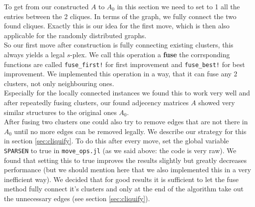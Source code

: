 To get from our constructed $A$ to $A_0$ in this section we need to set to 1 all the entries between the 2 cliques. 
In terms of the graph, we fully connect the two found cliques. Exactly this is our idea for the first move, which is 
then also applicable for the randomly distributed graphs.\\
So our first move after construction is fully connecting existing clusters, this always yields a legal $s$-plex. We 
call this operation a \textbf{fuse} the corrsponding functions are called \texttt{fuse\_first!} for first improvement 
and \texttt{fuse\_best!} for best improvement. We implemented this operation in a way, that it can fuse any 2 clusters, 
not only neighbouring ones.\\
Especially for the locally connected instances we found this to work very well and after repeatedly fusing clusters, 
our found adjecency matrices $A$ showed very similar structures to the original ones $A_0$.\\
After fusing two clusters one could also try to remove edges that are not there in $A_0$ until no more edges can be 
removed legally. We describe our strategy for this in section \ref{sec:cliquify}. To do this after every move, set the 
global variable \texttt{SPARSEN} to true in \texttt{move\_ops.jl} (as we said above: the code is very raw). We found 
that setting this to true improves the results slightly but greatly decreases performance (but we should mention here 
that we also implemented this in a very inefficient way). We decided that for good results it is sufficient to let 
the fuse method fully connect it's clusters and only at the end of the algorithm take out the unnecessary 
edges (see section \ref{sec:cliquify}).

\pagebreak

\null


